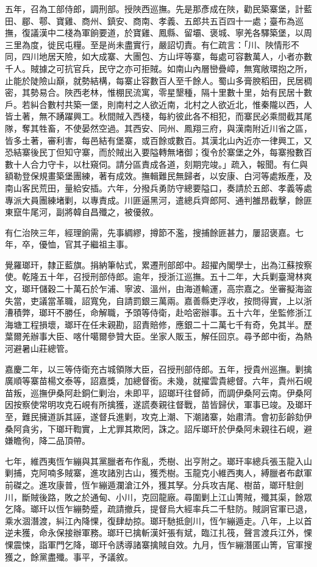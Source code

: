 \begin{pinyinscope}
五年，召為工部侍郎，調刑部。授陜西巡撫。先是那彥成在陜，勸民築寨堡，計藍田、郿、鄠、寶雞、商州、鎮安、商南、孝義、五郎共五百四十一處；臺布為巡撫，復議漢中二棧為軍餉要道，於寶雞、鳳縣、留壩、褒城、寧羌各驛築堡，以周三里為度，徙民屯糧。至是尚未盡實行，嚴詔切責。有仁疏言：「川、陜情形不同，四川地居天險，如大成寨、大團包、方山坪等寨，每處可容數萬人，小者亦數千人。賊據之可抗官兵，民守之亦可拒賊。如南山內層巒疊嶂，無寬敞環抱之所，止能於陡險山巔，就勢結構，每寨止容數百人至千餘人。蜀山多膏腴稻田，民居稠密，其勢易合。陜西老林，惟棚民流寓，零星墾種，隔十里數十里，始有民居十數戶。若糾合數村共築一堡，則南村之人欲近南，北村之人欲近北，惟秦隴以西，人皆土著，無不踴躍興工。秋間賊入西棧，每約彼此各不相犯，而寨民必乘間截其尾隊，奪其牲畜，不使晏然空過。其西安、同州、鳳翔三府，與漢南附近川省之區，皆多土著，審利害，每邑結有堡寨，或百餘或數百。其漢北山內近亦一律興工，又恐結寨後民丁但知守寨，而於賊出入要隘轉無堵御；復令於寨堡之外，每寨撥數百數十人合力守卡，以杜窺伺。請分區責成各道，刻期完竣。」疏入，報聞。有仁與額勒登保規畫築堡團練，著有成效。撫輯難民無歸者，以安康、白河等處叛產，及南山客民荒田，量給安插。六年，分撥兵勇防守總要隘口，奏請於五郎、孝義等處專派大員團練堵剿，以專責成。川匪逼黑河，遣總兵齊郎阿、通判雒昂截擊，餘匪東竄牛尾河，副將韓自昌殲之，被優敘。

有仁治陜三年，經理餉需，先事綢繆，撙節不濫，搜捕餘匪甚力，屢詔褒嘉。七年，卒，優恤，官其子繼祖主事。

覺羅瑯玕，隸正藍旗。捐納筆帖式，累遷刑部郎中。超擢內閣學士，出為江蘇按察使。乾隆五十年，召授刑部侍郎。逾年，授浙江巡撫。五十二年，大兵剿臺灣林爽文，瑯玕儲穀二十萬石於乍浦、寧波、溫州，由海道輸運，高宗嘉之。坐審擬海盜失當，吏議當革職，詔寬免，自請罰銀三萬兩。嘉善縣吏浮收，按問得實，上以浙漕積弊，瑯玕不勝任，命解職，予頭等侍衛，赴哈密辦事。五十六年，坐監修浙江海塘工程損壞，瑯玕在任未親勘，詔責賠修，應銀二十二萬七千有奇，免其半。歷葉爾羌辦事大臣、喀什噶爾參贊大臣。坐家人販玉，解任回京。尋予郎中銜，為熱河避暑山莊總管。

嘉慶二年，以三等侍衛充古城領隊大臣，召授刑部侍郎。五年，授貴州巡撫。剿擒廣順等寨苗楊文泰等，詔嘉獎，加總督銜。未幾，就擢雲貴總督。六年，貴州石峴苗叛，巡撫伊桑阿赴銅仁剿治，未即平，詔瑯玕往督師，而調伊桑阿云南。伊桑阿因按察使常明攻克石峴有所擒獲，遂謊奏親往督戰，苗皆歸伏，軍事已竣。及瑯玕至，難民擁道訴其誣，遂督兵進剿，攻克上潮、下潮諸寨，始肅清。會初彭齡劾伊桑阿貪劣，下瑯玕鞫實，上尤罪其欺罔，誅之。詔斥瑯玕於伊桑阿未親往石峴，避嫌瞻徇，降二品頂帶。

七年，維西夷恆乍繃與其黨臘者布作亂，禿樹、出亨附之。瑯玕率總兵張玉龍入山剿捕，克阿喃多賊寨，進攻諸別古山，獲禿樹。玉龍克小維西夷人，縛臘者布獻軍前磔之。進攻康普，恆乍繃遁瀾滄江外，獲其孥。分兵攻吉尾、樹苗，瑯玕駐劍川，斷賊後路，敗之於通甸、小川，克回龍廠。尋圍剿上江山箐賊，殲其渠，餘眾乞降。瑯玕以恆乍繃勢蹙，疏請撤兵，提督烏大經率兵二千駐防。賊詗官軍已退，乘水涸潛渡，糾江內降惈，復肆劫掠。瑯玕馳抵劍川，恆乍繃遁走。八年，上以首逆未獲，命永保接辦軍務。瑯玕已擒斬漢奸張有斌，臨江扎筏，聲言渡兵江外，惈惈震悚，詣軍門乞降，瑯玕令誘導諸寨擒賊自效。九月，恆乍繃潛匿山箐，官軍搜獲之，餘黨盡殲。事平，予議敘。


\end{pinyinscope}
